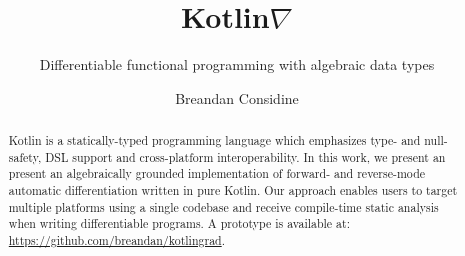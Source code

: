 \documentclass[sigconf]{acmart}
\begin{document}
\title{Kotlin$\nabla$}
\subtitle{Differentiable functional programming with algebraic data types}

\author{Breandan Considine}

\begin{abstract}
 Kotlin is a statically-typed programming language which emphasizes type- and null-safety, DSL support and cross-platform interoperability. In this work, we present an present an algebraically grounded implementation of forward- and reverse-mode automatic differentiation written in pure Kotlin. Our approach enables users to target multiple platforms using a single codebase and receive compile-time static analysis when writing differentiable programs. A prototype is available at: \url{https://github.com/breandan/kotlingrad}.
\end{abstract}




\maketitle





\end{document}
